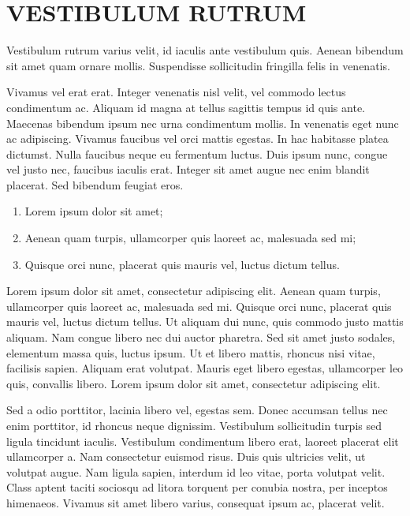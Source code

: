 \chapter{VESTIBULUM RUTRUM}

Vestibulum rutrum varius velit, id iaculis ante vestibulum quis. Aenean bibendum sit amet quam ornare mollis. Suspendisse sollicitudin fringilla felis in venenatis.

Vivamus vel erat erat. Integer venenatis nisl velit, vel commodo lectus condimentum ac. Aliquam id magna at tellus sagittis tempus id quis ante. Maecenas bibendum ipsum nec urna condimentum mollis. In venenatis eget nunc ac adipiscing. Vivamus faucibus vel orci mattis egestas. In hac habitasse platea dictumst. Nulla faucibus neque eu fermentum luctus. Duis ipsum nunc, congue vel justo nec, faucibus iaculis erat. Integer sit amet augue nec enim blandit placerat. Sed bibendum feugiat eros.

\begin{enumerate}
	\item Lorem ipsum dolor sit amet;
	\item Aenean quam turpis, ullamcorper quis laoreet ac, malesuada sed mi;
	\item Quisque orci nunc, placerat quis mauris vel, luctus dictum tellus.
\end{enumerate}

Lorem ipsum dolor sit amet, consectetur adipiscing elit. Aenean quam turpis, ullamcorper quis laoreet ac, malesuada sed mi. Quisque orci nunc, placerat quis mauris vel, luctus dictum tellus. Ut aliquam dui nunc, quis commodo justo mattis aliquam. Nam congue libero nec dui auctor pharetra. Sed sit amet justo sodales, elementum massa quis, luctus ipsum. Ut et libero mattis, rhoncus nisi vitae, facilisis sapien. Aliquam erat volutpat. Mauris eget libero egestas, ullamcorper leo quis, convallis libero. Lorem ipsum dolor sit amet, consectetur adipiscing elit.

Sed a odio porttitor, lacinia libero vel, egestas sem. Donec accumsan tellus nec enim porttitor, id rhoncus neque dignissim. Vestibulum sollicitudin turpis sed ligula tincidunt iaculis. Vestibulum condimentum libero erat, laoreet placerat elit ullamcorper a. Nam consectetur euismod risus. Duis quis ultricies velit, ut volutpat augue. Nam ligula sapien, interdum id leo vitae, porta volutpat velit. Class aptent taciti sociosqu ad litora torquent per conubia nostra, per inceptos himenaeos. Vivamus sit amet libero varius, consequat ipsum ac, placerat velit.

